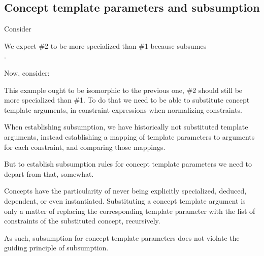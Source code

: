 \documentclass{wg21}
\begin{document}
\subsection{Concept template parameters and subsumption}

Consider

We expect \#2 to be more specialized than \#1 because  subsumes\\
.

Now, consider:



This example ought to be isomorphic to the previous one, \#2 should still be more specialized than \#1.
To do that we need to be able to substitute concept template arguments, in constraint expressions when normalizing constraints.

When establishing subsumption, we have historically not substituted template arguments, instead establishing a mapping of template parameters to arguments for each
constraint, and comparing those mappings.

But to establish subsumption rules for concept template parameters we need to depart from that, somewhat.

Concepts have the particularity of never being explicitly specialized, deduced, dependent, or even instantiated.
Substituting a concept template argument is only a matter of replacing the corresponding template parameter with the list of constraints of the substituted
concept, recursively.

As such, subsumption for concept template parameters does not violate the guiding principle of subsumption.

\end{document}
